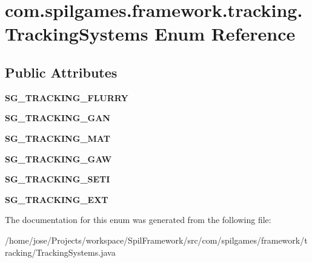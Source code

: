 \hypertarget{enumcom_1_1spilgames_1_1framework_1_1tracking_1_1_tracking_systems}{\section{com.\-spilgames.\-framework.\-tracking.\-Tracking\-Systems Enum Reference}
\label{enumcom_1_1spilgames_1_1framework_1_1tracking_1_1_tracking_systems}
}
\subsection*{Public Attributes}
\begin{DoxyCompactItemize}
\item 
\hypertarget{enumcom_1_1spilgames_1_1framework_1_1tracking_1_1_tracking_systems_a893475082551148437240a877cddec79}{{\bfseries S\-G\-\_\-\-T\-R\-A\-C\-K\-I\-N\-G\-\_\-\-F\-L\-U\-R\-R\-Y}}\label{enumcom_1_1spilgames_1_1framework_1_1tracking_1_1_tracking_systems_a893475082551148437240a877cddec79}

\item 
\hypertarget{enumcom_1_1spilgames_1_1framework_1_1tracking_1_1_tracking_systems_a10395b9fb756756c2817adaa813ae9c7}{{\bfseries S\-G\-\_\-\-T\-R\-A\-C\-K\-I\-N\-G\-\_\-\-G\-A\-N}}\label{enumcom_1_1spilgames_1_1framework_1_1tracking_1_1_tracking_systems_a10395b9fb756756c2817adaa813ae9c7}

\item 
\hypertarget{enumcom_1_1spilgames_1_1framework_1_1tracking_1_1_tracking_systems_a8b8d2b86a1f8a01d21c8d447360ba01b}{{\bfseries S\-G\-\_\-\-T\-R\-A\-C\-K\-I\-N\-G\-\_\-\-M\-A\-T}}\label{enumcom_1_1spilgames_1_1framework_1_1tracking_1_1_tracking_systems_a8b8d2b86a1f8a01d21c8d447360ba01b}

\item 
\hypertarget{enumcom_1_1spilgames_1_1framework_1_1tracking_1_1_tracking_systems_a01a6270d1a5bea70bfed8829784823aa}{{\bfseries S\-G\-\_\-\-T\-R\-A\-C\-K\-I\-N\-G\-\_\-\-G\-A\-W}}\label{enumcom_1_1spilgames_1_1framework_1_1tracking_1_1_tracking_systems_a01a6270d1a5bea70bfed8829784823aa}

\item 
\hypertarget{enumcom_1_1spilgames_1_1framework_1_1tracking_1_1_tracking_systems_a114b36e512e56f45e36119f6d4f15992}{{\bfseries S\-G\-\_\-\-T\-R\-A\-C\-K\-I\-N\-G\-\_\-\-S\-E\-T\-I}}\label{enumcom_1_1spilgames_1_1framework_1_1tracking_1_1_tracking_systems_a114b36e512e56f45e36119f6d4f15992}

\item 
\hypertarget{enumcom_1_1spilgames_1_1framework_1_1tracking_1_1_tracking_systems_a4921bb4349cc6b3d857e0f5fa78eaae6}{{\bfseries S\-G\-\_\-\-T\-R\-A\-C\-K\-I\-N\-G\-\_\-\-E\-X\-T}}\label{enumcom_1_1spilgames_1_1framework_1_1tracking_1_1_tracking_systems_a4921bb4349cc6b3d857e0f5fa78eaae6}

\end{DoxyCompactItemize}


The documentation for this enum was generated from the following file\-:\begin{DoxyCompactItemize}
\item 
/home/jose/\-Projects/workspace/\-Spil\-Framework/src/com/spilgames/framework/tracking/Tracking\-Systems.\-java\end{DoxyCompactItemize}
